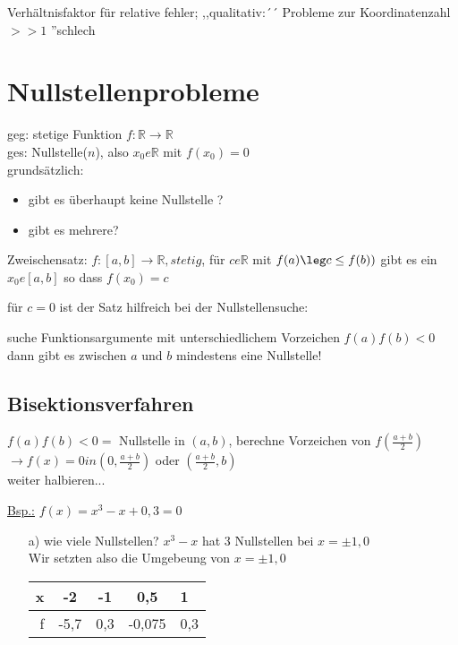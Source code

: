   Verhältnisfaktor für relative fehler; ,,qualitativ:´´ Probleme zur Koordinatenzahl $>> 1$
  ''schlech

\section{Nullstellenprobleme}
geg: stetige Funktion $f: \mathbb{R} \rightarrow \mathbb{R}$ \\
ges: Nullstelle($n$), also $x_0 e \mathbb{R}$ mit $f(x_0) = 0$ \\
grundsätzlich: 
\begin{itemize}
  \item gibt es überhaupt keine Nullstelle ?
  \item gibt es mehrere?
\end{itemize}
Zweischensatz: $f:[a,b] \rightarrow \mathbb{R}, stetig$, für $c e \mathbb{R}$ mit $f(a) \leg c \leq f(b))$ gibt
es ein $x_0 e [a,b]$ so dass $ f(x_0) = c$

für $c = 0$ ist der Satz hilfreich bei der Nullstellensuche:

suche Funktionsargumente mit unterschiedlichem Vorzeichen $f(a)f(b) < 0$ dann gibt es zwischen $a$ und $b$ mindestens eine Nullstelle!
\subsection{Bisektionsverfahren}
$f(a)f(b) < 0 = $ Nullstelle in $(a,b)$, berechne Vorzeichen von $f\left(\frac{a+b}{2}\right)$ \\
$\rightarrow f(x) = 0 in \left(0, \frac{a+b}{2}\right) $ oder $ \left(\frac{a+b}{2}, b\right)$ \\
weiter halbieren...

\underline{Bsp.:} $f(x) = x^3 - x + 0,3 = 0 $
\begin{enumerate}
  \item[a)] wie viele Nullstellen?
    $x^3-x$ hat 3 Nullstellen bei $x = \pm 1, 0$ \\
    Wir setzten also die Umgebeung von $x = \pm 1, 0 $ \\
    \begin{tabular}{r|c|c|c|l}
      x & -2 & -1 & 0,5 & 1 \\\hline
      f & -5,7 & 0,3 & -0,075 & 0,3
    \end{tabular}
\end{enumerate}

